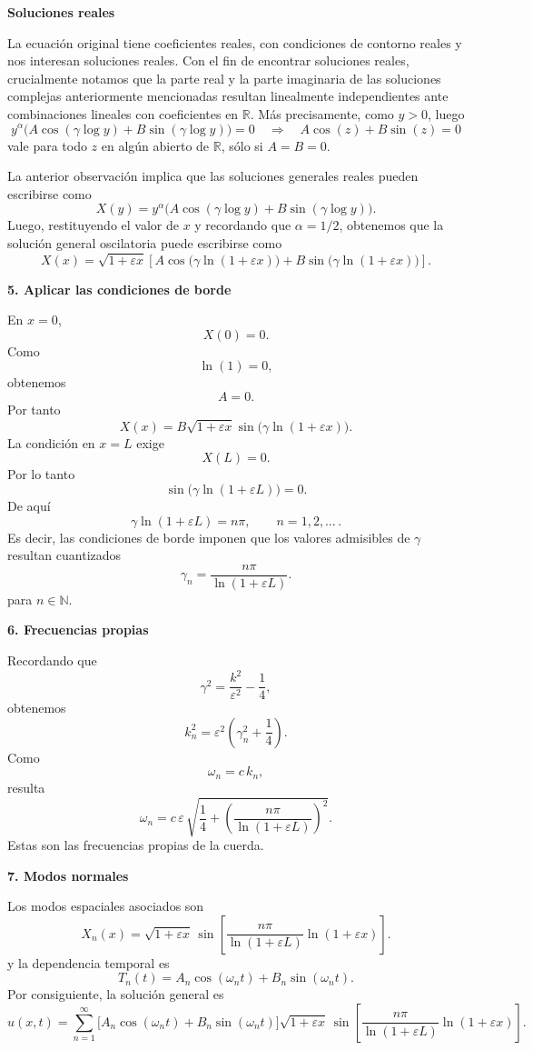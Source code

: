 \documentclass[11pt,spanish]{article}
\newcommand{\RR}{\mathbb{R}}
\newcommand{\NN}{\mathbb{N}}
\begin{document}
{\bf Soluciones reales}

La ecuación original tiene coeficientes reales, con condiciones de contorno reales y nos interesan soluciones reales.
Con el fin de encontrar soluciones reales, crucialmente notamos que la parte real y la parte imaginaria de las soluciones complejas anteriormente mencionadas resultan linealmente independientes ante combinaciones lineales con coeficientes en $\RR$.
M\'as precisamente, como $y>0$, luego 
$$
y^{\alpha}
\big(
A \cos(\gamma \log y)
+
B \sin(\gamma \log y)
\big)
=
0
\quad
\Rightarrow
\quad
A \cos(z)
+
B \sin(z)
=
0
$$
vale para todo $z$ en algún abierto de $\RR$, s\'olo si $A=B=0$.

La anterior observaci\'on implica que las soluciones generales reales pueden escribirse como
$$
X(y)
=
y^{\alpha}
\big(
A \cos(\gamma \log y)
+
B \sin(\gamma \log y)
\big)
.
$$
Luego, restituyendo el valor de $x$ y recordando que $\alpha=1/2$, obtenemos que la soluci\'on general oscilatoria puede escribirse como
$$
\boxed{
X(x)
=
\sqrt{1+\varepsilon x}
\left[
A\cos\Big(\gamma\ln(1+\varepsilon x)\Big)
+
B\sin\Big(\gamma\ln(1+\varepsilon x)\Big)
\right].
}
$$

{\bf 5. Aplicar las condiciones de borde}

En $x=0$,
$$
X(0)=0.
$$
Como
$$
\ln(1)=0,
$$
obtenemos
$$
A=0.
$$
Por tanto
$$
X(x)
=
B\sqrt{1+\varepsilon x}
\sin\Big(
\gamma
\ln(1+\varepsilon x)
\Big).
$$
La condición en $x=L$ exige
$$
X(L)=0.
$$
Por lo tanto
$$
\sin\Big(
\gamma
\ln(1+\varepsilon L)
\Big)
=0.
$$
De aquí
$$
\gamma\ln(1+\varepsilon L)
=
n\pi,
\qquad n=1,2,\ldots
\,.
$$
Es decir, las condiciones de borde imponen que los valores admisibles de $\gamma$ resultan cuantizados
$$
\boxed{
\gamma_n=
\frac{n\pi}
{\ln(1+\varepsilon L)}.
}
$$
para $n\in \NN$.

{\bf 6. Frecuencias propias}

Recordando que
$$
\gamma^2
=
\frac{k^2}{\varepsilon^2}
-\frac14,
$$
obtenemos
$$
k_n^2
=
\varepsilon^2
\left(
\gamma_n^2+\frac14
\right).
$$
Como
$$
\omega_n=c\,k_n,
$$
resulta
$$
\boxed{
\omega_n
=
c\,\varepsilon\,
\sqrt{
\frac14
+
\left(
\frac{n\pi}
{\ln(1+\varepsilon L)}
\right)^2
}.
}
$$
Estas son las frecuencias propias de la cuerda.

{\bf 7. Modos normales}

Los modos espaciales asociados son
$$
\boxed{
X_n(x)
=
\sqrt{1+\varepsilon x}\,
\sin\left[
\frac{n\pi}
{\ln(1+\varepsilon L)}
\ln(1+\varepsilon x)
\right].
}
$$
y la dependencia temporal es
$$
T_n(t)
=
A_n\cos(\omega_n t)
+
B_n\sin(\omega_n t).
$$
Por consiguiente, la solución general es
$$
\boxed{
u(x,t)
=
\sum_{n=1}^{\infty}
\Big[
A_n\cos(\omega_n t)
+
B_n\sin(\omega_n t)
\Big]
\sqrt{1+\varepsilon x}\,
\sin\left[
\frac{n\pi}
{\ln(1+\varepsilon L)}
\ln(1+\varepsilon x)
\right].
}
$$
\end{document}
